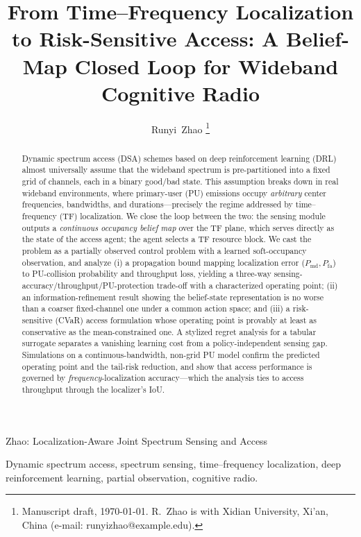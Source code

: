 \documentclass[journal]{IEEEtran}
\begin{document}
\title{From Time--Frequency Localization to Risk-Sensitive Access:
A Belief-Map Closed Loop for Wideband Cognitive Radio}

\author{Runyi~Zhao
\thanks{Manuscript draft, \today. R.~Zhao is with Xidian University, Xi'an,
China (e-mail: runyizhao@example.edu).}}

%
{Zhao: Localization-Aware Joint Spectrum Sensing and Access}

\maketitle

\begin{abstract}
Dynamic spectrum access (DSA) schemes based on deep reinforcement
learning (DRL) almost universally assume that the wideband spectrum is
pre-partitioned into a fixed grid of channels, each in a binary good/bad
state. This assumption breaks down in real wideband environments, where
primary-user (PU) emissions occupy \emph{arbitrary} center frequencies,
bandwidths, and durations---precisely the regime addressed by
time--frequency (TF) localization. We close the loop between the two: the
sensing module outputs a \emph{continuous occupancy belief map} over the TF
plane, which serves directly as the state of the access agent; the agent
selects a TF resource block. We cast the problem as a partially observed
control problem with a learned soft-occupancy observation, and analyze (i) a
propagation bound mapping localization error ($P_{\mathrm{md}},
P_{\mathrm{fa}}$) to PU-collision probability and throughput loss, yielding a
three-way sensing-accuracy/throughput/PU-protection trade-off with a
characterized operating point; (ii) an information-refinement result showing
the belief-state representation is no worse than a coarser fixed-channel one
under a common action space; and (iii) a risk-sensitive (CVaR) access
formulation whose operating point is provably at least as conservative as
the mean-constrained one. A stylized regret analysis for a tabular surrogate
separates a vanishing learning cost from a policy-independent sensing gap.
Simulations on a continuous-bandwidth, non-grid PU model confirm the
predicted operating point and the tail-risk reduction, and show that access
performance is governed by \emph{frequency}-localization accuracy---which the
analysis ties to access throughput through the localizer's IoU.
\end{abstract}

\begin{IEEEkeywords}
Dynamic spectrum access, spectrum sensing, time--frequency localization,
deep reinforcement learning, partial observation, cognitive radio.
\end{IEEEkeywords}
\end{document}

